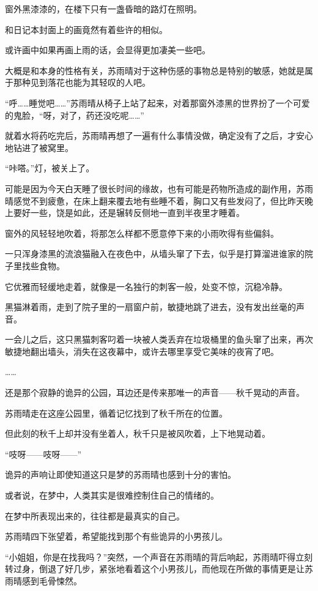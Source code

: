 窗外黑漆漆的，在楼下只有一盏昏暗的路灯在照明。

和日记本封面上的画竟然有着些许的相似。

或许画中如果再画上雨的话，会显得更加凄美一些吧。

大概是和本身的性格有关，苏雨晴对于这种伤感的事物总是特别的敏感，她就是属于那种见到落花也能为其轻叹的人吧。

“呼……睡觉吧……”苏雨晴从椅子上站了起来，对着那窗外漆黑的世界扮了一个可爱的鬼脸，“呀，对了，药还没吃呢……”

就着水将药吃完后，苏雨晴再想了一遍有什么事情没做，确定没有了之后，才安心地钻进了被窝里。

“咔嗒。”灯，被关上了。

可能是因为今天白天睡了很长时间的缘故，也有可能是药物所造成的副作用，苏雨晴感觉不到疲惫，在床上翻来覆去地有些睡不着，胸口又有些发闷了，但比昨天晚上要好一些，饶是如此，还是辗转反侧地一直到半夜里才睡着。

窗外的风轻轻地吹着，将那怎么样都不愿意停下来的小雨吹得有些偏斜。

一只浑身漆黑的流浪猫融入在夜色中，从墙头窜了下去，似乎是打算溜进谁家的院子里找些食物。

它优雅而轻缓地走着，就像是一名独行的刺客一般，处变不惊，沉稳冷静。

黑猫淋着雨，走到了院子里的一扇窗户前，敏捷地跳了进去，没有发出丝毫的声音。

一会儿之后，这只黑猫刺客叼着一块被人类丢弃在垃圾桶里的鱼头窜了出来，再次敏捷地翻出墙头，消失在这夜幕中，或许去哪里享受它美味的夜宵了吧。

……

还是那个寂静的诡异的公园，耳边还是传来那唯一的声音——秋千晃动的声音。

苏雨晴走在这座公园里，循着记忆找到了秋千所在的位置。

但此刻的秋千上却并没有坐着人，秋千只是被风吹着，上下地晃动着。

“吱呀——吱呀——”

诡异的声响让即使知道这只是梦的苏雨晴也感到十分的害怕。

或者说，在梦中，人类其实是很难控制住自己的情绪的。

在梦中所表现出来的，往往都是最真实的自己。

苏雨晴四下张望着，希望能找到那个有些诡异的小男孩儿。

“小姐姐，你是在找我吗？”突然，一个声音在苏雨晴的背后响起，苏雨晴吓得立刻转过身，倒退了好几步，紧张地看着这个小男孩儿，而他现在所做的事情更是让苏雨晴感到毛骨悚然。

